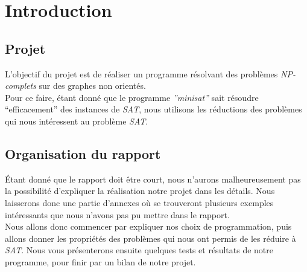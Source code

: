  \section{Introduction}

  \subsection{Projet}
  L'objectif du projet est de réaliser un programme résolvant des
  problèmes \emph{NP-complets} sur des graphes non orientés.\\

  Pour ce faire, étant donné que le programme \emph{''minisat''} sait
  résoudre ``efficacement'' des instances de \emph{SAT}, nous utilisons
  les réductions des problèmes qui nous intéressent au problème
  \emph{SAT}.

  \subsection{Organisation du rapport}
  Étant donné que le rapport doit être court, nous n'aurons
  malheureusement pas la possibilité d'expliquer la réalisation notre
  projet dans les détails. Nous laisserons donc une partie d'annexes où
  se trouveront plusieurs exemples intéressants que nous n'avons pas pu
  mettre dans le rapport.\\

  Nous allons donc commencer par expliquer nos choix de programmation,
  puis allons donner les propriétés des problèmes qui nous ont permis de
  les réduire à \emph{SAT}. Nous vous présenterons ensuite quelques
  tests et résultats de notre programme, pour finir par un bilan de
  notre projet.